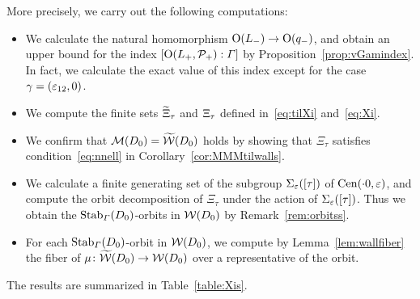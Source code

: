 \documentclass{amsart} %
\begin{document}
More precisely,
we carry out the following computations:
%
\begin{itemize}
\item 
We calculate the natural homomorphism $\mathord{\mathrm{O}}(L_{-})\to \mathord{\mathrm{O}}(q_{-})$,
and obtain an upper bound for the index $[\mathord{\mathrm{O}}(L_{+}, \mathord{\mathcal{P}}_{+}): \varGamma]$
by Proposition~\ref{prop:vGamindex}.
In fact,
we calculate the exact value of this index except for the case $ \gamma=(\varepsilon_{12}, 0)$.
\item 
We  compute the finite sets $\widetilde{\Xi}_{\tau}$ and $\Xi_{\tau}$
defined in~\eqref{eq:tilXi} and~\eqref{eq:Xi}.
\item 
We confirm that $\mathord{\mathcal{M}}(D_0)=\widetilde{\mathord{\mathcal{W}}} (D_0)$ holds
by showing that $\Xi_{\tau}$ satisfies  condition~\ref{eq:nnell}
in Corollary~\ref{cor:MMMtilwalls}.
\item 
We calculate a finite generating set of 
the subgroup $\Sigma_{\varepsilon}([\tau])$ of $\mathrm{Cen}(\cdot 0, \varepsilon)$,
and compute the orbit decomposition of  $\Xi_{\tau}$ under the action of $\Sigma_{\varepsilon}([\tau])$.
Thus we obtain 
the $\operatorname{Stab}_{\varGamma}(D_0)$-orbits in $\mathord{\mathcal{W}}(D_0)$
by Remark~\ref{rem:orbitss}.
\item
For each $\operatorname{Stab}_{\varGamma}(D_0)$-orbit in $\mathord{\mathcal{W}}(D_0)$,
we compute by Lemma~\ref{lem:wallfiber} the  fiber of $\mu\colon \widetilde{\mathord{\mathcal{W}}}(D_0)\to \mathord{\mathcal{W}}(D_0)$
over a representative of the orbit.
\end{itemize}
%
The results are summarized in Table~\ref{table:Xis}.
%
\end{document}
